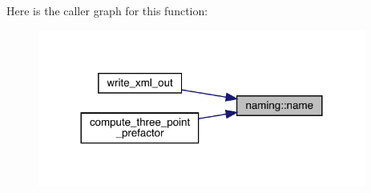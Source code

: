 Here is the caller graph for this function\+:\nopagebreak
\begin{figure}[H]
\begin{center}
\leavevmode
\includegraphics[width=305pt]{d4/da2/namespacenaming_a0be3b30603f24f1e39a06c9a0fbdca7e_icgraph}
\end{center}
\end{figure}

